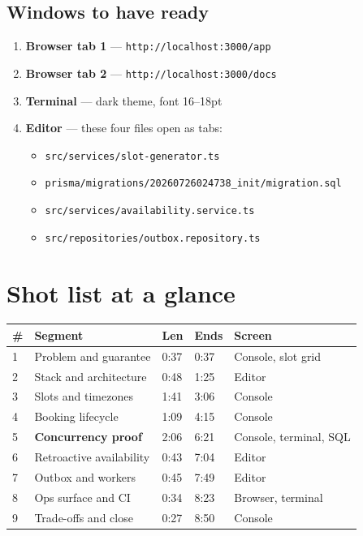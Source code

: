 \documentclass[11pt,a4paper]{article}
\begin{document}
\subsection*{Windows to have ready}

\begin{enumerate}[leftmargin=*,itemsep=2pt]
  \item \textbf{Browser tab 1} --- \texttt{http://localhost:3000/app}
  \item \textbf{Browser tab 2} --- \texttt{http://localhost:3000/docs}
  \item \textbf{Terminal} --- dark theme, font 16--18pt
  \item \textbf{Editor} --- these four files open as tabs:
    \begin{itemize}[leftmargin=1.2em,topsep=2pt,itemsep=1pt]
      \item \texttt{src/services/slot-generator.ts}
      \item \texttt{prisma/migrations/20260726024738\_init/migration.sql}
      \item \texttt{src/services/availability.service.ts}
      \item \texttt{src/repositories/outbox.repository.ts}
    \end{itemize}
\end{enumerate}

\section{Shot list at a glance}

\begin{longtable}{@{}p{0.6cm} p{5.6cm} p{1.4cm} p{1.4cm} p{5.2cm}@{}}
\toprule
\textbf{\#} & \textbf{Segment} & \textbf{Len} & \textbf{Ends} & \textbf{Screen} \\
\midrule
\endhead
1 & Problem and guarantee        & 0:37 & 0:37 & Console, slot grid \\
2 & Stack and architecture       & 0:48 & 1:25 & Editor \\
3 & Slots and timezones          & 1:41 & 3:06 & Console \\
4 & Booking lifecycle            & 1:09 & 4:15 & Console \\
5 & \textbf{Concurrency proof}   & 2:06 & 6:21 & Console, terminal, SQL \\
6 & Retroactive availability     & 0:43 & 7:04 & Editor \\
7 & Outbox and workers           & 0:45 & 7:49 & Editor \\
8 & Ops surface and CI           & 0:34 & 8:23 & Browser, terminal \\
9 & Trade-offs and close         & 0:27 & 8:50 & Console \\
\bottomrule
\end{longtable}
\end{document}
